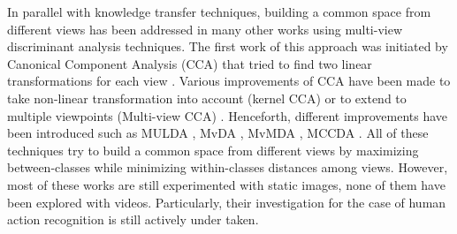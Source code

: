 
        In parallel with knowledge transfer techniques, building a common space from different views has been addressed in many other works using multi-view discriminant analysis techniques. The first work of this approach was initiated by Canonical Component Analysis (CCA) that tried to find two linear transformations for each view \cite{thompson1984canonical}. Various improvements of CCA have been made to take non-linear transformation into account (kernel CCA) or to extend to multiple viewpoints (Multi-view CCA) \cite{hardoon2004canonical}. %
        Henceforth, different improvements have been introduced such as MULDA \cite{yang2014multi}, MvDA \cite{kan2015multi}, MvMDA \cite{you2019multi}, MCCDA \cite{you2019multi}. All of these techniques try to build a common space from different views by maximizing between-classes while minimizing within-classes distances among views. However, most of these works are still experimented with static images, none of them have been explored with videos. Particularly, their investigation for the case of human action recognition is still actively under taken.

